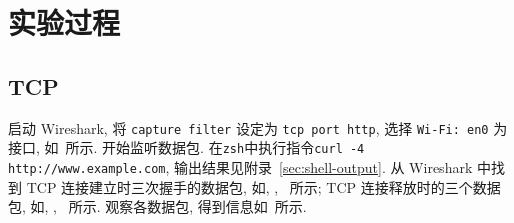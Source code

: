 \documentclass{ned-article}
\begin{document}
\section{实验过程}

\subsection{TCP}

启动 Wireshark, 将 \texttt{capture filter} 设定为 \texttt{tcp port http}, 选择 \texttt{Wi-Fi: en0} 为接口, 如~所示. 开始监听数据包. 在\texttt{zsh}中执行指令\texttt{curl -4 http://www.example.com}, 输出结果见附录~\ref{sec:shell-output}. 从 Wireshark 中找到 TCP 连接建立时三次握手的数据包, 如, , ~所示; TCP 连接释放时的三个数据包, 如, , ~所示. 观察各数据包, 得到信息如~所示.
\end{document}
